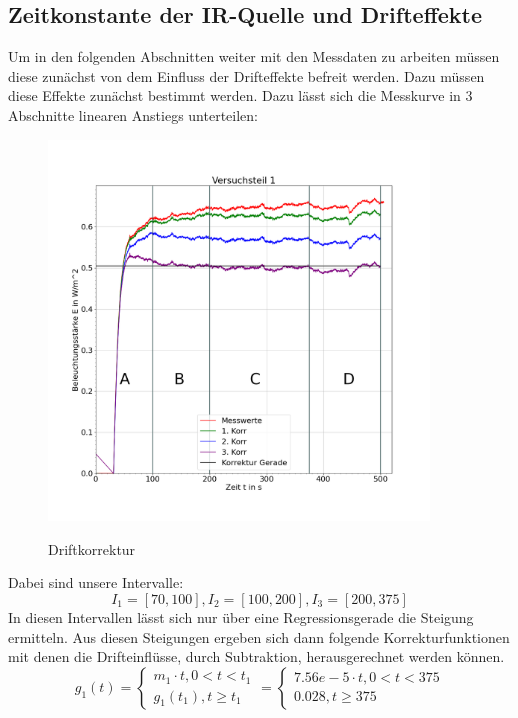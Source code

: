 \documentclass{article}
\begin{document}
        \subsection{Zeitkonstante der IR-Quelle und Drifteffekte}
            Um in den folgenden Abschnitten weiter mit den Messdaten zu arbeiten müssen diese zunächst von dem Einfluss der Drifteffekte
            befreit werden. Dazu müssen diese Effekte zunächst bestimmt werden.
            Dazu lässt sich die Messkurve in 3 Abschnitte linearen Anstiegs unterteilen:
            \begin{figure}[H]
                \includegraphics[width=0.9\textwidth]{Daten/DriftKorrektur.png}
                \label{DriftKorr}
                \caption{Driftkorrektur}
            \end{figure}
            Dabei sind unsere Intervalle:
            \begin{equation}
                I_1 = [70,100], I_2=[100,200],I_3=[200,375]
            \end{equation}
            In diesen Intervallen lässt sich nur über eine Regressionsgerade die Steigung ermitteln.
            Aus diesen Steigungen ergeben sich dann folgende Korrekturfunktionen mit denen
            die Drifteinflüsse, durch Subtraktion, herausgerechnet werden können.
            \begin{equation}
                g_1(t)=
                \begin{cases}
                    m_1\cdot t, 0<t<t_1\\
                    g_1(t_1),t\geq t_1
                \end{cases}
                = 
                \begin{cases}
                    7.56e-5\cdot t, 0<t<375\\
                    0.028,t\geq 375
                \end{cases}
            \end{equation}
            
\end{document}
